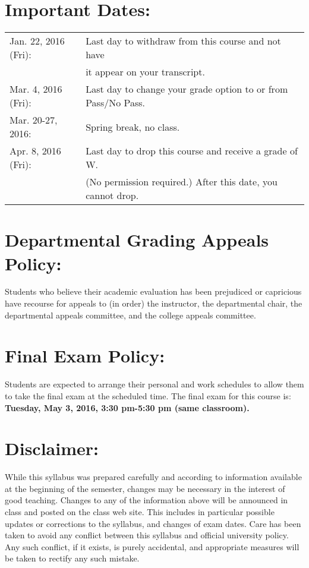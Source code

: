 \documentclass[margin]{res}
\theoremstyle{plain}
\theoremstyle{definition}
\theoremstyle{remark}
\begin{document}
\begin{resume}
\section{Important Dates:}
\begin{tabular}{ll}

Jan. 22, 2016 (Fri): & Last day to withdraw from this course and not have\\& it appear on your transcript.\\

Mar. 4, 2016 (Fri): & Last day to change your grade option to or from Pass/No
    Pass.\\
    
Mar. 20-27, 2016:   & Spring break, no class.\\
Apr. 8, 2016 (Fri): &  Last day to drop this course and receive a grade of W. \\&
     (No permission required.) After this date, you cannot drop.
  \end{tabular}

\section{Departmental Grading Appeals Policy:} Students who believe their academic evaluation has been prejudiced or capricious have recourse for appeals to (in order) the instructor, the departmental chair, the departmental appeals committee, and the college appeals committee.  

\section{Final Exam Policy:} Students are expected to arrange their personal and
work schedules to allow them to take the final exam at the scheduled time.  The
final exam for this course is:\\ 
\textbf{Tuesday, May 3, 2016,  3:30 pm-5:30 pm (same classroom).}   


\section{Disclaimer:} 
While this syllabus was prepared carefully and according to information
available at the beginning of the semester, changes may be necessary in the
interest of good teaching. Changes to any of the information above will
be announced in class and posted on the class web site. This includes in
particular possible updates or corrections to the syllabus, and changes of
exam dates. Care has been taken to avoid any conflict between this syllabus and official university policy. Any such conflict, if it exists, is purely accidental, and appropriate measures will be taken to rectify any such mistake. 


\end{resume}
\end{document}
